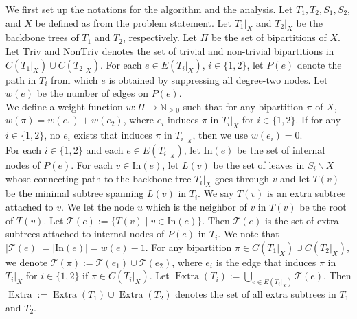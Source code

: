 \documentclass{article}
\newcommand{\In}{\mathrm{In}}
\newcommand{\triv}{\mathrm{Triv}}
\newcommand{\ntriv}{\mathrm{NonTriv}}
\DeclareMathOperator*{\extra}{Extra}
\begin{document}
We first set up the notations for the algorithm and the analysis. Let $T_1,T_2,S_1,S_2$, and $X$ be defined as from the problem statement. Let $T_1|_X$ and $T_2|_X$ be the backbone trees of $T_1$ and $T_2$, respectively. Let $\Pi$ be the set of bipartitions of $X$. Let $\triv$ and $\ntriv$ denotes the set of trivial and non-trivial bipartitions in $C(T_1|_X) \cup C(T_2|_X)$. For each $e \in E(T_i|_X)$, $i \in \{1,2\}$, let $P(e)$ denote the path in $T_i$ from which $e$ is obtained by suppressing all degree-two nodes. Let $w(e)$ be the number of edges on $P(e)$. \\

We define a weight function $w:\Pi \to \mathbb{N}_{\ge 0}$ such that for any bipartition $\pi$ of $X$, $w(\pi) = w(e_1) + w(e_2)$, where $e_i$ induces $\pi$ in $T_i|_X$ for $i \in \{1,2\}$. If for any $i \in \{1,2\}$, no $e_i$ exists that induces $\pi$ in $T_i|_X$, then we use $w(e_i) = 0$.\\

For each $i \in \{1,2\}$ and each $e \in E(T_i|_X)$, let $\In(e)$ be the set of internal nodes of $P(e)$. For each $v \in \In(e)$, let $L(v)$ be the set of leaves in $S_i \backslash X$ whose connecting path to the backbone tree $T_i|_X$ goes through $v$ and let $T(v)$ be the minimal subtree spanning $L(v)$ in $T_i$. We say $T(v)$ is an extra subtree attached to $v$. We let the node $u$ which is the neighbor of $v$ in $T(v)$ be the root of $T(v)$. Let $\mathcal{T}(e) := \{T(v) \mid v \in \In(e)\}$. Then $\mathcal{T}(e)$ is the set of extra subtrees attached to internal nodes of $P(e)$ in $T_i$. We note that $|\mathcal{T}(e)| = |\In(e)| = w(e)-1$. For any bipartition $\pi \in C(T_1|_X) \cup C(T_2|_X)$, we denote $\mathcal{T}(\pi) := \mathcal{T}(e_1) \cup \mathcal{T}(e_2)$, where $e_i$ is the edge that induces $\pi$ in $T_i|_X$ for $i \in \{1,2\}$ if $\pi \in C(T_i|_X)$. Let $\extra(T_i) := \bigcup_{e \in E(T_i|_X)} \mathcal{T}(e)$. Then $\extra := \extra(T_1) \cup \extra(T_2)$ denotes the set of all extra subtrees in $T_1$ and $T_2$.\\
\end{document}
